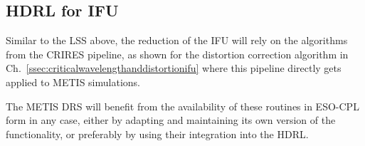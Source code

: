 \subsection{HDRL for IFU}
\label{ssec:hdrllms}

Similar to the LSS above, the reduction of the IFU will rely on the algorithms
from the \ac{CRIRES} pipeline, as shown for the distortion correction algorithm
in Ch.~\ref{ssec:criticalwavelengthanddistortionifu} where this pipeline
directly gets applied to METIS simulations.

The METIS \ac{DRS} will benefit from the availability of these routines in ESO-CPL
form in any case, either by adapting and maintaining its own version of the
functionality, or preferably by using their integration into the HDRL. 